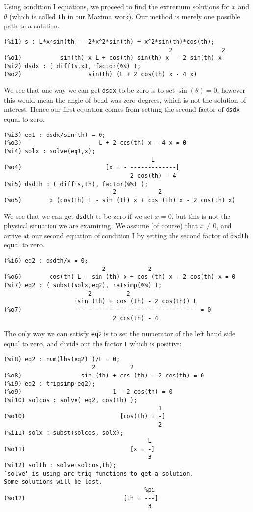 \documentclass[12pt]{article}
\begin{document}
\smallskip
Using condition I equations, we proceed to find the extremum solutions for $x$ and $\theta$
  (which is called \verb|th| in our Maxima work).
Our method is merely one possible path to a solution.  
\small
\begin{verbatim}
(%i1) s : L*x*sin(th) - 2*x^2*sin(th) + x^2*sin(th)*cos(th);
                                               2              2
(%o1)           sin(th) x L + cos(th) sin(th) x  - 2 sin(th) x
(%i2) dsdx : ( diff(s,x), factor(%%) );
(%o2)                   sin(th) (L + 2 cos(th) x - 4 x)
\end{verbatim}
\normalsize
We see that one way we can get \verb|dsdx| to be zero is to set $\sin(\theta) = 0$,
  however this would mean the angle of bend was zero degrees, which is not the solution
  of interest.
Hence our first equation comes from setting the second factor of \verb|dsdx| equal to zero.
\small
\begin{verbatim}
(%i3) eq1 : dsdx/sin(th) = 0;
(%o3)                      L + 2 cos(th) x - 4 x = 0
(%i4) solx : solve(eq1,x);
                                          L
(%o4)                        [x = - -------------]
                                    2 cos(th) - 4
(%i5) dsdth : ( diff(s,th), factor(%%) );
                               2            2
(%o5)        x (cos(th) L - sin (th) x + cos (th) x - 2 cos(th) x)									
\end{verbatim}
\normalsize
We see that we can get \verb|dsdth| to be zero if we set $x = 0$, but this
  is not the physical situation we are examining.
We assume (of course) that $x \neq 0$, and arrive at our second equation of
  condition I by setting the second factor of \verb|dsdth| equal to zero.
\small
\begin{verbatim}
(%i6) eq2 : dsdth/x = 0;
                            2            2
(%o6)        cos(th) L - sin (th) x + cos (th) x - 2 cos(th) x = 0
(%i7) eq2 : ( subst(solx,eq2), ratsimp(%%) );
                        2          2
                    (sin (th) + cos (th) - 2 cos(th)) L
(%o7)               ----------------------------------- = 0
                               2 cos(th) - 4
\end{verbatim}
\normalsize
The only way we can satisfy \verb|eq2| is to set the numerator of the left hand
  side equal to zero, and divide out the factor \verb|L| which is positive:
\small
\begin{verbatim}
(%i8) eq2 : num(lhs(eq2) )/L = 0;
                         2          2
(%o8)                 sin (th) + cos (th) - 2 cos(th) = 0
(%i9) eq2 : trigsimp(eq2);
(%o9)                          1 - 2 cos(th) = 0
(%i10) solcos : solve( eq2, cos(th) );
                                            1
(%o10)                           [cos(th) = -]
                                            2
(%i11) solx : subst(solcos, solx);
                                         L
(%o11)                              [x = -]
                                         3
(%i12) solth : solve(solcos,th);
`solve' is using arc-trig functions to get a solution.
Some solutions will be lost.
                                        %pi
(%o12)                            [th = ---]
                                         3
\end{verbatim}
\normalsize
  
\end{document}
